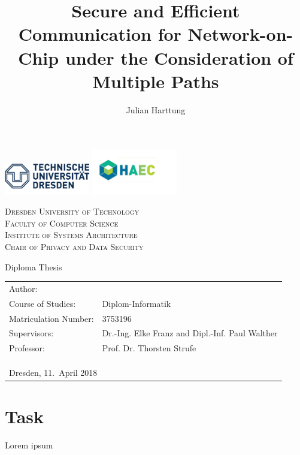 \documentclass[
	paper=a4,
	fontsize=11pt,
	parskip=full %
]{scrreprt}
\author{Julian Harttung}
\title{Secure and Efficient Communication for Network-on-Chip under the Consideration of Multiple Paths}
\newcommand{\thesubtitle}{Diploma Thesis}
\newcommand{\theuniversity}{Dresden University of Technology}
\newcommand{\thefaculty}{Faculty of Computer Science}
\newcommand{\theinstitute}{Institute of Systems Architecture}
\newcommand{\thechair}{Chair of Privacy and Data Security}
\begin{document}
    \frenchspacing %
	\begin{titlepage}
		\includegraphics[width=0.28\textwidth]{header_logo_tud}
		\hfill
		\includegraphics[width=0.28\textwidth]{header_logo_haec} %
		\vspace{1.5\baselineskip}
		
		\begin{center}
			\textsc{\theuniversity \\
					\thefaculty \\
					\theinstitute \\
					\thechair}
			\vspace{2.5\baselineskip}
		
			\Huge{\thetitle}
			\vspace{.5\baselineskip}
			
			\LARGE{\thesubtitle}
		\end{center}
		
		\vfill
		
		\begin{tabular}{ll}
			Author:               & \theauthor \\
			Course of Studies:    & Diplom-Informatik \\
			Matriculation Number: & 3753196 \\
			Supervisors:          & Dr.-Ing. Elke Franz and Dipl.-Inf. Paul Walther \\
			Professor:            & Prof. Dr. Thorsten Strufe \\
			\multicolumn{2}{l}{ } \\
			\multicolumn{2}{l}{ } \\
			\multicolumn{2}{l}{ } \\
			\multicolumn{2}{l}{Dresden, 11.\ April 2018} %
		\end{tabular}
	\end{titlepage}
	
	
	
	\chapter*{Task}
    Lorem ipsum
	
\end{document}
